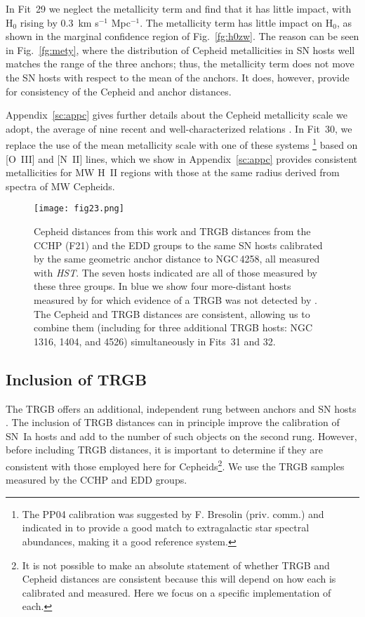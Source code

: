 \documentclass[12pt]{aastex631}
\newcommand{\kms}{km s$^{-1}$ Mpc$^{-1}$}
\begin{document}
In Fit~29 we neglect the metallicity term and find that it has little impact, with H$_0$ rising by 0.3~\kms.  The metallicity term has little impact on H$_0$, as shown in the marginal confidence region of Fig.~\ref{fg:h0zw}.  The reason can be seen in Fig.~\ref{fg:mety}, where the distribution of Cepheid metallicities in SN hosts well matches the range of the three anchors; thus, the metallicity term does not move the SN hosts with respect to the mean of the anchors.  It does, however, provide for consistency of the Cepheid and anchor distances.

Appendix~\ref{sc:appc} gives further details about the Cepheid metallicity scale we adopt, the average of nine recent and well-characterized relations \citep{Teimoorinia:2021}.  In Fit~30, we replace the use of the mean metallicity scale with one of these systems \citep{Pettini:2004}\footnote{The PP04 calibration was suggested by F. Bresolin (priv. comm.) and indicated in \citet{Bresolin:2016} to provide a good match to extragalactic star spectral abundances, making it a good reference system.} based on [O~III] and [N~II] lines, which we show in Appendix~\ref{sc:appc} provides consistent metallicities for MW H~II regions with those at the same radius derived from spectra of MW Cepheids.  

\begin{figure}[b]  
\begin{center}
\texttt{[image: fig23.png]}
\end{center}
\caption{\label{fg:trgb} Cepheid distances from this work and TRGB distances from the CCHP (F21) and the EDD \citep{Anand:2021} groups to the same SN hosts calibrated by the same geometric anchor distance to NGC$\,$4258, all measured with {\it HST}.  The seven hosts indicated are all of those measured by these three groups.  In blue we show four more-distant hosts measured by \citet{Jang:2017} for which evidence of a TRGB was not detected by \citet{Anand:2021}.  The Cepheid and TRGB distances are consistent, allowing us to combine them (including for three additional TRGB hosts: NGC$\,$1316, 1404, and 4526) simultaneously in Fits~31 and 32.}
\end{figure}

\clearpage

\subsection{Inclusion of TRGB\label{sc:6.7}}

The TRGB offers an additional, independent rung between anchors and SN hosts \citep[][and references therein]{Freedman:2019,Anand:2021}. The inclusion of TRGB distances can in principle improve the calibration of SN~Ia hosts and add to the number of such objects on the second rung.  However, before including TRGB distances, it is important to determine if they are consistent with those employed here for Cepheids\footnote{It is not possible to make an absolute statement of whether TRGB and Cepheid distances are consistent because this will depend on how each is calibrated and measured.  Here we focus on a specific implementation of each.}.  We use the TRGB samples measured by the CCHP \citep{Freedman:2021} and EDD \citep{Anand:2021} groups.
\end{document}
